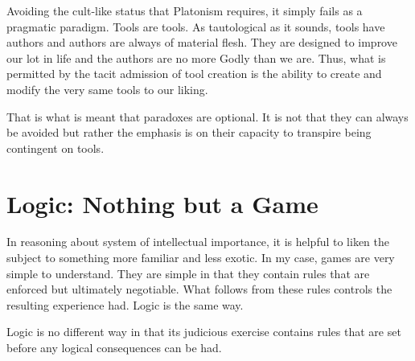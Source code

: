 \documentclass{article}
\begin{document}
	Avoiding the cult-like status that Platonism requires, it simply fails as a pragmatic paradigm. Tools are tools. As tautological as it sounds, tools have authors and authors are always of material flesh. They are designed to improve our lot in life and the authors are no more Godly than we are. Thus, what is permitted by the tacit admission of tool creation is the ability to create and modify the very same tools to our liking.
	
	That is what is meant that paradoxes are optional. It is not that they can always be avoided but rather the emphasis is on their capacity to transpire being contingent on tools.
	
	\section{Logic: Nothing but a Game}
	
	In reasoning about system of intellectual importance, it is helpful to liken the subject to something more familiar and less exotic. In my case, games are very simple to understand. They are simple in that they contain rules that are enforced but ultimately negotiable. What follows from these rules controls the resulting experience had. Logic is the same way.
	
	Logic is no different way in that its judicious exercise contains rules that are set before any logical consequences can be had.
\end{document}
